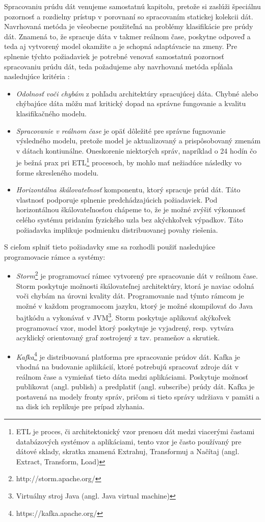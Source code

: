 Spracovaniu prúdu dát venujeme samostatnú kapitolu, pretože si zaslúži špeciálnu pozornosť a rozdielny prístup v porovnaní so spracovaním statickej kolekcii dát. Navrhovaná metóda je všeobecne použiteľná na problémy klasifikácie pre prúdy dát. Znamená to, že spracuje dáta v takmer reálnom čase, poskytne odpoveď a teda aj vytvorený model okamžite a je schopná adaptávacie na zmeny. Pre splnenie týchto požiadaviek je potrebné venovať samostatnú pozornosť spracovaniu prúdu dát, teda požadujeme aby navrhovaná metóda spĺňala nasledujúce kritéria \citep{cimerman2015prudy}:
\begin{itemize}
	\item \textit{Odolnosť voči chybám} z pohľadu architektúry spracujúcej dáta. Chybné alebo chýbajúce dáta môžu mať kritický dopad na správne fungovanie a kvalitu klasifikačného modelu.
	\item \textit{Spracovanie v reálnom čase} je opäť dôležité pre správne fugnovanie výsledného modelu, pretože model je aktualizovaný a prispôsobovaný zmenám v dátach kontiunálne. Oneskorenie niektorých správ, napríklad o 24 hodín čo je bežná prax pri ETL\footnote{ETL je proces, či architektonický vzor prenosu dát medzi viacerými častami databázových systémov  a aplikáciami, tento vzor je často používaný pre dátové sklady, skratka znamená Extrahuj, Transformuj a Načítaj (angl. Extract, Transform, Load)} procesoch, by mohlo mať nežiadúce následky vo forme skresleného modelu.
	\item \textit{Horizontálna škálovateľnosť} komponentu, ktorý spracuje prúd dát. Táto vlastnosť podporuje splnenie predchádzajúcich požiadaviek. Pod horizontálnou škálovateľnosťou chápeme to, že je možné zvýšiť výkonnosť celého systému pridaním fyzického uzla bez akýchkoľvek výpadkov. Táto požiadavka implikuje podmienku distribuovanej povahy riešenia.
\end{itemize}

S cieľom splniť tieto požiadavky sme sa rozhodli použiť nasledujúce programovacie rámce a systémy:
\begin{itemize}
	\item \textit{Storm}\footnote{http://storm.apache.org/} je programovací rámec vytvorený pre spracovanie dát v reálnom čase. Storm poskytuje možnosti škálovateľnej architektúry, ktorá je naviac odolná voči chybám na úrovni kvality dát. Programovanie nad týmto rámcom je možné v každom programocom jazyku, ktorý je možné skompilovať do Java bajtkódu a vykonávať v JVM\footnote{Virtuálny stroj Java (angl. Java virtual machine)}. Storm poskytuje aplikovať akýkoľvek programovací vzor, model ktorý poskytuje je vyjadrený, resp. vytvára acyklický orientovaný graf zostrojený z tzv. prameňov a skrutiek.
	\item \textit{Kafka}\footnote{https://kafka.apache.org/} je distribuovaná platforma pre spracovanie prúdov dát. Kafka je vhodná na budovanie apliikácií, ktoré potrebujú spracovať zdroje dát v reálnom čase a vymieňať tieto dáta medzi aplikáciami. Poskytuje možnosť publikovat (angl. publish) a predplatiť (angl. subscribe) prúdy dát. Kafka je postavená na modely fronty správ, pričom si tieto správy udržiava v pamäti a na disk ich replikuje pre prípad zlyhania.
\end{itemize}

